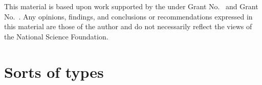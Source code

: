 \documentclass[acmsmall,review,anonymous]{acmart}\settopmatter{printfolios=true,printccs=false,printacmref=false}
\begin{document}


\begin{acks}                            %
  This material is based upon work supported by the
   under Grant
  No.~ and Grant
  No.~.  Any opinions, findings, and
  conclusions or recommendations expressed in this material are those
  of the author and do not necessarily reflect the views of the
  National Science Foundation.
\end{acks}

% 

\section{Sorts of types}
% 
\end{document}
